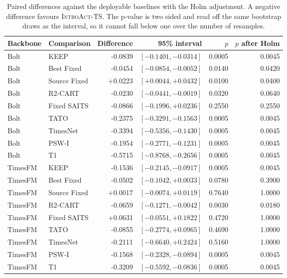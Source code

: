 \documentclass{article}
\newcommand{\introact}{\textsc{IntroAct-TS}}
\begin{document}
\begin{table}[htbp]
  \caption{Paired differences against the deployable baselines with the Holm adjustment.
  A negative difference favours \introact{}. The p-value is two sided and read off the same
  bootstrap draws as the interval, so it cannot fall below one over the number of resamples.}
  \label{tab:app-holm}
  \centering
  \small
  \setlength{\tabcolsep}{4pt}
\begin{tabular*}{\textwidth}{@{\extracolsep{\fill}}llrrrr@{}}
    \toprule
    Backbone & Comparison & Difference & 95\% interval & $p$ & $p$ after Holm \\
    \midrule
Bolt & KEEP & -0.0839 & $[-0.1401,-0.0314]$ & 0.0005 & 0.0045 \\
Bolt & Best Fixed & -0.0454 & $[-0.0854,-0.0052]$ & 0.0140 & 0.0420 \\
Bolt & Source Fixed & +0.0223 & $[+0.0044,+0.0432]$ & 0.0100 & 0.0400 \\
Bolt & R2-CART & -0.0230 & $[-0.0441,-0.0019]$ & 0.0320 & 0.0640 \\
Bolt & Fixed SAITS & -0.0866 & $[-0.1996,+0.0236]$ & 0.2550 & 0.2550 \\
Bolt & TATO & -0.2375 & $[-0.3291,-0.1563]$ & 0.0005 & 0.0045 \\
Bolt & TimesNet & -0.3394 & $[-0.5356,-0.1430]$ & 0.0005 & 0.0045 \\
Bolt & PSW-I & -0.1954 & $[-0.2771,-0.1231]$ & 0.0005 & 0.0045 \\
Bolt & T1 & -0.5715 & $[-0.8768,-0.2656]$ & 0.0005 & 0.0045 \\
TimesFM & KEEP & -0.1536 & $[-0.2145,-0.0917]$ & 0.0005 & 0.0045 \\
TimesFM & Best Fixed & -0.0502 & $[-0.1042,+0.0033]$ & 0.0780 & 0.3900 \\
TimesFM & Source Fixed & +0.0017 & $[-0.0074,+0.0119]$ & 0.7640 & 1.0000 \\
TimesFM & R2-CART & -0.0659 & $[-0.1271,-0.0042]$ & 0.0030 & 0.0180 \\
TimesFM & Fixed SAITS & +0.0631 & $[-0.0551,+0.1822]$ & 0.4720 & 1.0000 \\
TimesFM & TATO & -0.0855 & $[-0.2774,+0.0965]$ & 0.4690 & 1.0000 \\
TimesFM & TimesNet & -0.2111 & $[-0.6640,+0.2424]$ & 0.5160 & 1.0000 \\
TimesFM & PSW-I & -0.1568 & $[-0.2328,-0.0894]$ & 0.0005 & 0.0045 \\
TimesFM & T1 & -0.3209 & $[-0.5592,-0.0836]$ & 0.0005 & 0.0045 \\

\end{tabular*}
\end{table}
\end{document}

